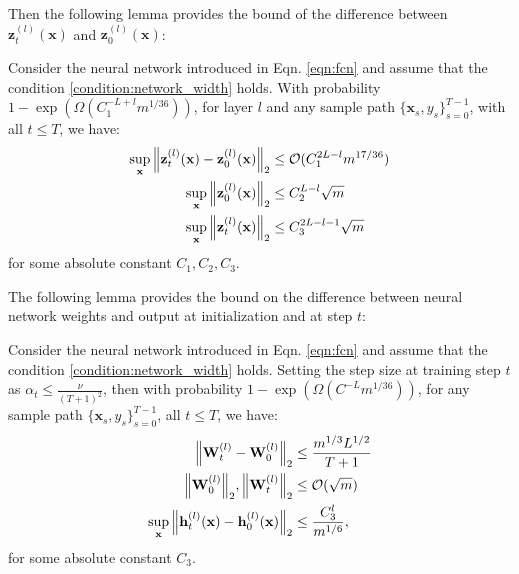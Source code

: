 Then the following lemma provides the bound of the difference between $\mathbf{z}_t^{(l)}(\mathbf{x})$ and $\mathbf{z}_0^{(l)}(\mathbf{x})$:
\begin{auxlemma}
\label{lemma:neural_cbo_nn_sensitivity_bound}
Consider the neural network introduced in Eqn. \ref{eqn:fcn} and assume that the condition \ref{condition:network_width} holds. With probability $1 - \exp (\Omega( C_1^{-L+l} m^{1/36}))$, for layer $l$ and any sample path $\{ \mathbf{x}_s, y_s\}_{s=0}^{T-1}$, with all $t\le T$, we have:
\begin{align*}
    \sup_\mathbf{x} \norm{\mathbf{z}_t^{(l)}(\mathbf{x}) - \mathbf{z}_0^{(l)}(\mathbf{x})}_2 & \le \mathcal{O}(C_1^{2L-l} m^{17/36}) 
    \\
    \sup_\mathbf{x} \norm{\mathbf{z}_0^{(l)}(\mathbf{x})}_2 &  \le C_2^{L-l} \sqrt{m}
    \\
    \sup_\mathbf{x} \norm{\mathbf{z}_t^{(l)}(\mathbf{x})}_2 &  \le C_3^{2L-l-1} \sqrt{m}
    \\
\end{align*}
for some absolute constant $C_1, C_2, C_3$.
\end{auxlemma}



The following lemma provides the bound on the difference between neural network weights and output at initialization and at step $t$:

\begin{auxlemma}
\label{lemma:neural_cbo_weights_and_output_bounds}
Consider the neural network introduced in Eqn. \ref{eqn:fcn} and assume that the condition \ref{condition:network_width} holds. Setting the step size at training step $t$ as $\alpha_t \le \frac{\nu}{(T+1)^2}$, then with probability $1 - \exp (\Omega( C^{-L} m^{1/36}))$, for any sample path $\{ \mathbf{x}_s, y_s\}_{s=0}^{T-1}$, all $t\le T$, we have:
\begin{align*}
    \norm{\mathbf{W}_t^{(l)} - \mathbf{W}_0^{(l)}}_2 & \le \frac{m^{1/3}L^{1/2}}{T+1} \\
    \norm{\mathbf{W}_0^{(l)}}_2, \norm{\mathbf{W}_t^{(l)}}_2 & \le \mathcal{O}(\sqrt{m})
    \\
    \sup_\mathbf{x} \norm{\mathbf{h}_t^{(l)}(\mathbf{x}) - \mathbf{h}_0^{(l)}(\mathbf{x})}_2 & \le \frac{C_3^l}{m^{1/6}}, 
\end{align*}
for some absolute constant $C_3$.
\end{auxlemma}


